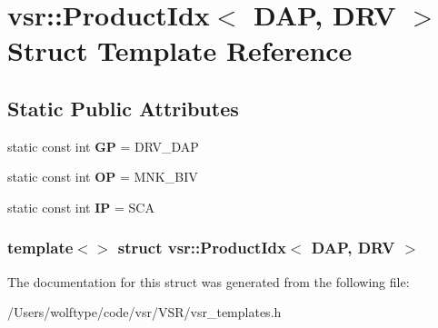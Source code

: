 \hypertarget{structvsr_1_1_product_idx_3_01_d_a_p_00_01_d_r_v_01_4}{\section{vsr\-:\-:Product\-Idx$<$ D\-A\-P, D\-R\-V $>$ Struct Template Reference}
\label{structvsr_1_1_product_idx_3_01_d_a_p_00_01_d_r_v_01_4}
}
\subsection*{Static Public Attributes}
\begin{DoxyCompactItemize}
\item 
\hypertarget{structvsr_1_1_product_idx_3_01_d_a_p_00_01_d_r_v_01_4_ae2a435c76e1f3a947fcfc98ce25f1dd9}{static const int {\bfseries G\-P} = D\-R\-V\-\_\-\-D\-A\-P}\label{structvsr_1_1_product_idx_3_01_d_a_p_00_01_d_r_v_01_4_ae2a435c76e1f3a947fcfc98ce25f1dd9}

\item 
\hypertarget{structvsr_1_1_product_idx_3_01_d_a_p_00_01_d_r_v_01_4_af1794985fcdd2b07d153b1eac21ed20c}{static const int {\bfseries O\-P} = M\-N\-K\-\_\-\-B\-I\-V}\label{structvsr_1_1_product_idx_3_01_d_a_p_00_01_d_r_v_01_4_af1794985fcdd2b07d153b1eac21ed20c}

\item 
\hypertarget{structvsr_1_1_product_idx_3_01_d_a_p_00_01_d_r_v_01_4_a0ca106c547fccfdc6476c3dbd2b935ea}{static const int {\bfseries I\-P} = S\-C\-A}\label{structvsr_1_1_product_idx_3_01_d_a_p_00_01_d_r_v_01_4_a0ca106c547fccfdc6476c3dbd2b935ea}

\end{DoxyCompactItemize}
\subsubsection*{template$<$$>$ struct vsr\-::\-Product\-Idx$<$ D\-A\-P, D\-R\-V $>$}



The documentation for this struct was generated from the following file\-:\begin{DoxyCompactItemize}
\item 
/\-Users/wolftype/code/vsr/\-V\-S\-R/vsr\-\_\-templates.\-h\end{DoxyCompactItemize}
